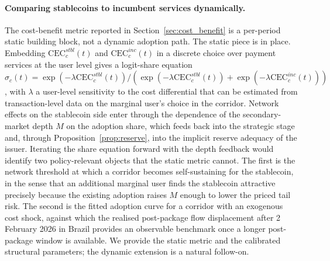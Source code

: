 \paragraph{Comparing stablecoins to incumbent services dynamically.} The cost-benefit metric reported in Section~\ref{sec:cost_benefit} is a per-period static building block, not a dynamic adoption path. The static piece is in place. Embedding $\mathrm{CEC}^{stbl}_c(t)$ and $\mathrm{CEC}^{inc}_c(t)$ in a discrete choice over payment services at the user level gives a logit-share equation $\sigma_c(t) = \exp(-\lambda \mathrm{CEC}^{stbl}_c(t)) / (\exp(-\lambda \mathrm{CEC}^{stbl}_c(t)) + \exp(-\lambda \mathrm{CEC}^{inc}_c(t)))$, with $\lambda$ a user-level sensitivity to the cost differential that can be estimated from transaction-level data on the marginal user's choice in the corridor. Network effects on the stablecoin side enter through the dependence of the secondary-market depth $M$ on the adoption share, which feeds back into the strategic stage and, through Proposition~\ref{prop:reserve}, into the implicit reserve adequacy of the issuer. Iterating the share equation forward with the depth feedback would identify two policy-relevant objects that the static metric cannot. The first is the network threshold at which a corridor becomes self-sustaining for the stablecoin, in the sense that an additional marginal user finds the stablecoin attractive precisely because the existing adoption raises $M$ enough to lower the priced tail risk. The second is the fitted adoption curve for a corridor with an exogenous cost shock, against which the realised post-package flow displacement after 2 February 2026 in Brazil provides an observable benchmark once a longer post-package window is available. We provide the static metric and the calibrated structural parameters; the dynamic extension is a natural follow-on.

